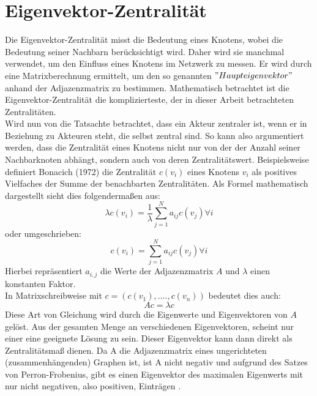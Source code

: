 \section{Eigenvektor-Zentralität}
Die Eigenvektor-Zentralität misst die Bedeutung eines Knotens, wobei die Bedeutung seiner Nachbarn berücksichtigt wird. Daher wird sie manchmal verwendet, um den Einfluss eines Knotens im Netzwerk zu messen. Er wird durch eine Matrixberechnung ermittelt, um den so genannten $"Haupteigenvektor"$ anhand der Adjazenzmatrix zu bestimmen. Mathematisch betrachtet ist die Eigenvektor-Zentralität die komplizierteste, der in dieser Arbeit betrachteten Zentralitäten.\\
Wird nun von die Tatsachte betrachtet, dass ein Akteur zentraler ist, wenn er in Beziehung zu Akteuren steht, die selbst zentral sind. So kann also argumentiert werden, dass die Zentralität eines Knotens nicht nur von der der Anzahl seiner Nachbarknoten abhängt, sondern auch von deren Zentralitätswert. Beispielsweise definiert Bonacich (1972) die Zentralität $c(v_i)$ eines Knotens $v_i$ als positives Vielfaches der Summe der benachbarten Zentralitäten. Als Formel mathematisch dargestellt sieht dies folgendermaßen aus:
\begin{equation}
     \lambda c(v_i) = \frac{1}{\lambda} \sum_{j=1}^{N}a_{ij}c(v_j) \forall i
\end{equation} oder umgeschrieben:  
\begin{equation}
     c(v_i) = \sum_{j=1}^{N}a_{ij}c(v_j) \forall i
\end{equation}
Hierbei repräsentiert $a_{i,j}$ die Werte der Adjazenzmatrix $A$ und $\lambda$ einen konstanten Faktor. \\
In Matrixschreibweise mit $c = (c(v_1), ...., c(v_n))$ bedeutet dies auch:
\begin{equation}
     Ac = \lambda c
\end{equation}
Diese Art von Gleichung wird durch die Eigenwerte und Eigenvektoren von $A$ gelöst.
Aus der gesamten Menge an verschiedenen Eigenvektoren, scheint nur einer eine geeignete Lösung zu sein. 
Dieser Eigenvektor kann dann direkt als Zentralitätsmaß dienen. Da A die Adjazenzmatrix eines ungerichteten (zusammenhängenden) Graphen ist, ist A nicht negativ und aufgrund des Satzes von Perron-Frobenius, gibt es einen Eigenvektor des maximalen Eigenwerts mit nur nicht negativen, also positiven, Einträgen \cite{brittaRuhnau}.

